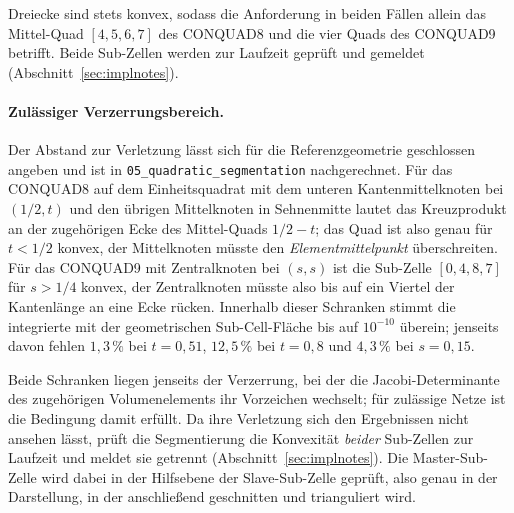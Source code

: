 \documentclass[a4paper,11pt]{article}
\def\tfrac#1#2{#1/#2}%
\newcommand{\file}[1]{\texttt{\small #1}}
\begin{document}
\medskip
\noindent Dreiecke sind stets konvex, sodass die Anforderung in beiden Fällen allein das
Mittel-Quad $[4,5,6,7]$ des CONQUAD8 und die vier Quads des CONQUAD9 betrifft. Beide Sub-Zellen
werden zur Laufzeit geprüft und gemeldet (Abschnitt~\ref{sec:implnotes}).

\paragraph{Zulässiger Verzerrungsbereich.}
Der Abstand zur Verletzung lässt sich für die Referenzgeometrie geschlossen angeben und ist in
\file{05\_quadratic\_segmentation} nachgerechnet. Für das CONQUAD8 auf dem Einheitsquadrat mit dem
unteren Kantenmittelknoten bei $(\tfrac12,t)$ und den übrigen Mittelknoten in Sehnenmitte lautet
das Kreuzprodukt an der zugehörigen Ecke des Mittel-Quads $\tfrac12-t$; das Quad ist also genau für
$t<\tfrac12$ konvex, der Mittelknoten müsste den \emph{Elementmittelpunkt} überschreiten. Für das
CONQUAD9 mit Zentralknoten bei $(s,s)$ ist die Sub-Zelle $[0,4,8,7]$ für $s>\tfrac14$ konvex, der
Zentralknoten müsste also bis auf ein Viertel der Kantenlänge an eine Ecke rücken. Innerhalb dieser
Schranken stimmt die integrierte mit der geometrischen Sub-Cell-Fläche bis auf $10^{-10}$ überein;
jenseits davon fehlen $1{,}3\,\%$ bei $t=0{,}51$, $12{,}5\,\%$ bei $t=0{,}8$ und $4{,}3\,\%$ bei
$s=0{,}15$.

Beide Schranken liegen jenseits der Verzerrung, bei der die Jacobi-Determinante des zugehörigen
Volumenelements ihr Vorzeichen wechselt; für zulässige Netze ist die Bedingung damit erfüllt. Da
ihre Verletzung sich den Ergebnissen nicht ansehen lässt, prüft die Segmentierung die Konvexität
\emph{beider} Sub-Zellen zur Laufzeit und meldet sie getrennt (Abschnitt~\ref{sec:implnotes}).
Die Master-Sub-Zelle wird dabei in der Hilfsebene der Slave-Sub-Zelle geprüft, also genau in der
Darstellung, in der anschließend geschnitten und trianguliert wird.
\end{document}
